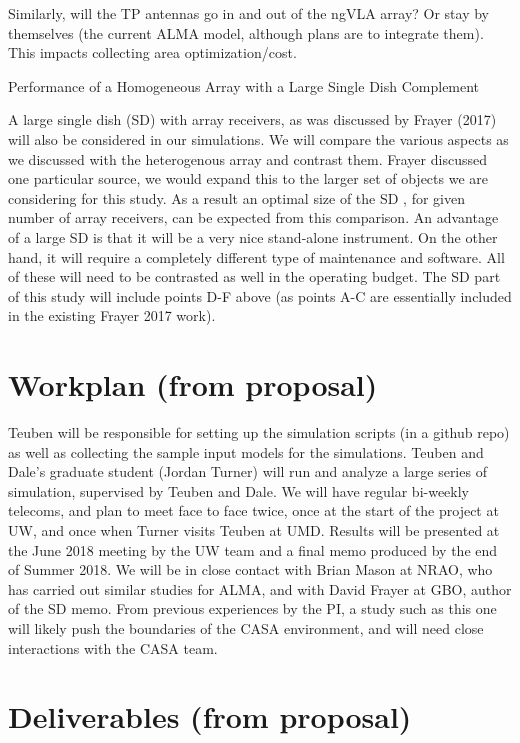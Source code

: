 \documentclass[11pt,twoside]{article}
\begin{document}
Similarly, will the TP antennas go in and out of the ngVLA array? Or
stay by themselves (the current ALMA model, although plans are to
integrate them). This impacts collecting area optimization/cost.


Performance of a Homogeneous Array with a Large Single Dish Complement

A large single dish (SD) with array receivers, as was discussed by
Frayer (2017) will also be considered in our simulations. We will
compare the various aspects as we discussed with the heterogenous
array and contrast them. Frayer discussed one particular source, we
would expand this to the larger set of objects we are considering for
this study. As a result an optimal size of the SD , for given number
of array receivers, can be expected from this comparison.  An
advantage of a large SD is that it will be a very nice stand-alone
instrument. On the other hand, it will require a completely different
type of maintenance and software.  All of these will need to be
contrasted as well in the operating budget. The SD part of this study
will include points D-F above (as points A-C are essentially included
in the existing Frayer 2017 work).


\section{Workplan (from proposal)}

Teuben will be responsible for setting up the simulation scripts (in a
github repo) as well as collecting the sample input models for the
simulations. Teuben and Dale's graduate student (Jordan Turner) will
run and analyze a large series of simulation, supervised by Teuben and
Dale. We will have regular bi-weekly telecoms, and plan to meet face
to face twice, once at the start of the project at UW, and once when
Turner visits Teuben at UMD. Results will be presented at the June
2018 meeting by the UW team and a final memo produced by the end of
Summer 2018. We will be in close contact with Brian Mason at NRAO, who
has carried out similar studies for ALMA, and with David Frayer at
GBO, author of the SD memo.  From previous experiences by the PI, a
study such as this one will likely push the boundaries of the CASA
environment, and will need close interactions with the CASA team.




\section{Deliverables  (from proposal)}
\end{document}
